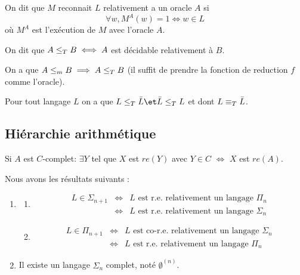 \begin{definition}[Reconnaissance]

	On dit que $M$ reconnait $L$ relativement a un oracle $A$ si
	$$ \forall w, M^A (w) = 1 \iff w \in L $$
	où $M^A$ est l'exécution de $M$ avec l'oracle $A$.

\end{definition}

\begin{definition}
	On dit que $A \leq_T B \iff A$ est décidable relativement à $B$.
\end{definition}

\begin{remarque}
	On a que $A \leq_m B \implies A \leq_T B$ (il suffit de prendre la fonction de reduction $f$ comme l'oracle).
\end{remarque}

\begin{remarque}
	Pour tout langage $L$ on a que $L \leqt \bar L \et \bar L \leqt L$ et dont $L \equiv_T \bar L$.
\end{remarque}


\subsection{Hiérarchie arithmétique}

\begin{lemma}
	Si $A$ est $C$-complet:  $\exists Y$ tel que $X$ est $re(Y)$ avec $Y \in C$ $\iff$ $X$ est $re(A)$.
\end{lemma}

\begin{theorem} [de post]
	Nous avons les résultats suivants :
	\begin{enumerate}
		\item
		      \begin{enumerate}
			      \item
			            \begin{eqnarray*}
				            L \in \Sigma_{n+1} &\iff& L \text{ est r.e. relativement  un langage }  \Pi_n  \\
				            &\iff& L \text{ est r.e. relativement  un langage }  \Sigma_{n}
			            \end{eqnarray*}

			      \item
			            \begin{eqnarray*}
				            L \in \Pi_{n+1} &\iff& L \text{ est co-r.e. relativement  un langage }  \Sigma_n  \\
				            &\iff& L \text{ est r.e. relativement  un langage }  \Pi_n
			            \end{eqnarray*}
		      \end{enumerate}

		\item Il existe un langage $\Sigma_n$ complet, noté $\emptyset^{(n)}$.
	\end{enumerate}
\end{theorem}


